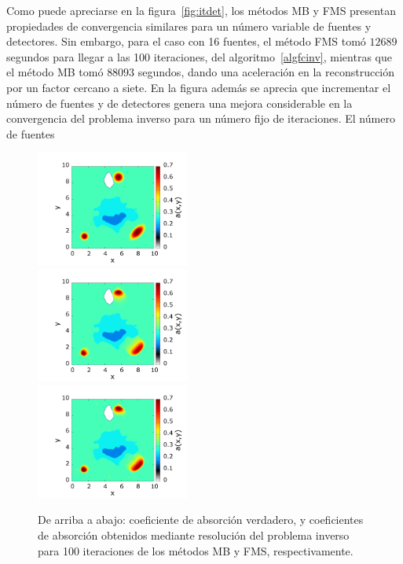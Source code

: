 Como puede apreciarse en la figura~\ref{fig:itdet}, los métodos MB y FMS 
presentan propiedades de convergencia similares para un número variable 
de fuentes y detectores. Sin embargo, para el caso con 16 fuentes, 
el método FMS tomó  $12689$ segundos para llegar a las 100 iteraciones, 
del algoritmo~\ref{algfcinv}, mientras que el método MB tomó $88093$ segundos, 
dando una aceleración en la reconstrucción por un factor cercano a siete. 
En la figura además se aprecia que incrementar el número de fuentes y de detectores 
genera una mejora considerable en la convergencia del problema inverso 
para un número fijo de iteraciones. El número de fuentes 
\begin{figure}
\centering
  \includegraphics[width=0.45\textwidth]{figuras/necktrue.png}\\

  \includegraphics[width=0.45\textwidth]{figuras/necksweep.png}\\

  \includegraphics[width=0.45\textwidth]{figuras/neckmss.png}
  \caption{De arriba a abajo: coeficiente de absorción verdadero, y
  coeficientes de absorción obtenidos mediante resolución del problema inverso para 100 iteraciones de los métodos MB y FMS, respectivamente.}
 \label{fig:reconst}
\end{figure}
